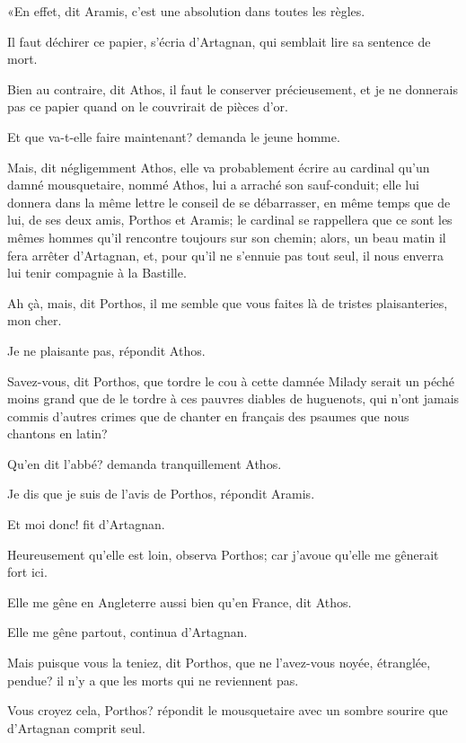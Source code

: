 «En effet, dit Aramis, c'est une absolution dans toutes les règles. 

\speak  Il faut déchirer ce papier, s'écria d'Artagnan, qui semblait lire sa sentence de mort. 

\speak  Bien au contraire, dit Athos, il faut le conserver précieusement, et je ne donnerais pas ce papier quand on le couvrirait de pièces d'or. 

\speak  Et que va-t-elle faire maintenant? demanda le jeune homme. 

\speak  Mais, dit négligemment Athos, elle va probablement écrire au cardinal qu'un damné mousquetaire, nommé Athos, lui a arraché son sauf-conduit; elle lui donnera dans la même lettre le conseil de se débarrasser, en même temps que de lui, de ses deux amis, Porthos et Aramis; le cardinal se rappellera que ce sont les mêmes hommes qu'il rencontre toujours sur son chemin; alors, un beau matin il fera arrêter d'Artagnan, et, pour qu'il ne s'ennuie pas tout seul, il nous enverra lui tenir compagnie à la Bastille. 

\speak  Ah çà, mais, dit Porthos, il me semble que vous faites là de tristes plaisanteries, mon cher. 

\speak  Je ne plaisante pas, répondit Athos. 

\speak  Savez-vous, dit Porthos, que tordre le cou à cette damnée Milady serait un péché moins grand que de le tordre à ces pauvres diables de huguenots, qui n'ont jamais commis d'autres crimes que de chanter en français des psaumes que nous chantons en latin? 

\speak  Qu'en dit l'abbé? demanda tranquillement Athos. 

\speak  Je dis que je suis de l'avis de Porthos, répondit Aramis. 

\speak  Et moi donc! fit d'Artagnan. 

\speak  Heureusement qu'elle est loin, observa Porthos; car j'avoue qu'elle me gênerait fort ici. 

\speak  Elle me gêne en Angleterre aussi bien qu'en France, dit Athos. 

\speak  Elle me gêne partout, continua d'Artagnan. 

\speak  Mais puisque vous la teniez, dit Porthos, que ne l'avez-vous noyée, étranglée, pendue? il n'y a que les morts qui ne reviennent pas. 

\speak  Vous croyez cela, Porthos? répondit le mousquetaire avec un sombre sourire que d'Artagnan comprit seul. 

